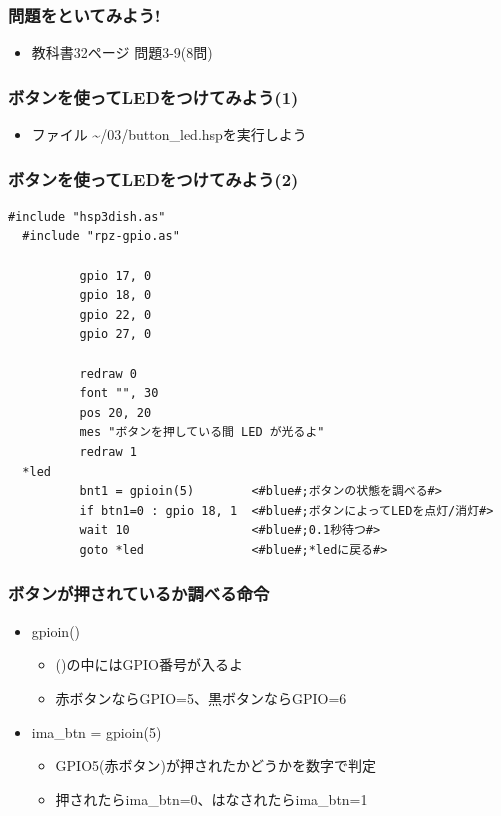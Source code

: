 \begin{frame}
  \frametitle{問題をといてみよう!}
  \begin{itemize}
    \item 教科書32ページ 問題3-9(8問)
  \end{itemize}
\end{frame}

\begin{frame}
  \frametitle{ボタンを使ってLEDをつけてみよう(1)}
  \begin{itemize}
    \item ファイル \rightarrow \sim/03/button\_led.hspを実行しよう
  \end{itemize}
\end{frame}

\begin{frame}[fragile]
  \frametitle{ボタンを使ってLEDをつけてみよう(2)}
  \begin{lstlisting}[title=button\_led.hsp, label=button_led.hsp]
  #include "hsp3dish.as"
  #include "rpz-gpio.as"
  
          gpio 17, 0
          gpio 18, 0
          gpio 22, 0
          gpio 27, 0

          redraw 0
          font "", 30
          pos 20, 20
          mes "ボタンを押している間 LED が光るよ"
          redraw 1
  *led
          bnt1 = gpioin(5)        <#blue#;ボタンの状態を調べる#>
          if btn1=0 : gpio 18, 1  <#blue#;ボタンによってLEDを点灯/消灯#>
          wait 10                 <#blue#;0.1秒待つ#>
          goto *led               <#blue#;*ledに戻る#>
  \end{lstlisting}
\end{frame}

\begin{frame}
  \frametitle{ボタンが押されているか調べる命令}
  \begin{itemize}
    \item gpioin()
          \begin{itemize}
            \item ()の中にはGPIO番号が入るよ
            \item 赤ボタンならGPIO=5、黒ボタンならGPIO=6
          \end{itemize}
    \item ima\_btn = gpioin(5)
          \begin{itemize}
            \item GPIO5(赤ボタン)が押されたかどうかを数字で判定
            \item 押されたらima\_btn=0、はなされたらima\_btn=1
          \end{itemize}
  \end{itemize}
\end{frame}

